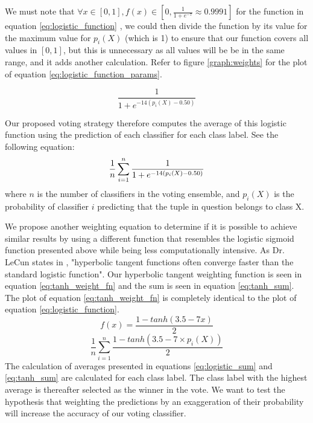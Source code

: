 We must note that $\forall x \in [0,1], f(x) \in [0, \frac{1}{1+e^{-7}}\approx 0.9991]$ for the function in equation \ref{eq:logistic_function} , we could then divide the function by its value for the maximum value for $p_i(X)$ (which is 1) to ensure that our function covers all values in $[0,1]$, but this is unnecessary as all values will be be in the same range, and it adds another calculation.
Refer to figure \ref{graph:weights} for the plot of equation \ref{eq:logistic_function_params}.

\begin{equation}
\frac{1}{1+e^{-14(p_i(X)-0.50)}}
\label{eq:logistic_function_params}
\end{equation}

Our proposed voting strategy therefore computes the average of this logistic function using the prediction of each classifier for each class label. See the following equation:
\begin{equation}
\frac{1}{n}\sum_{i=1}^{n}\frac{1}{1+e^{-14(p_i(X)-0.50)}}\\ 
    \label{eq:logistic_sum}
\end{equation}
where $n$ is the number of classifiers in the voting ensemble, and $p_i(X)$ is the probability of classifier $i$ predicting that the tuple in question belongs to class X.

We propose another weighting equation to determine if it is possible to achieve similar results by using a different function that resembles the logistic sigmoid function presented above while being less computationally intensive. As Dr. LeCun states in \citep[10]{lecun2012efficient},  "hyperbolic tangent functions often converge faster than the standard logistic function".
Our hyperbolic tangent weighting function is seen in equation \ref{eq:tanh_weight_fn} and the sum is seen in equation \ref{eq:tanh_sum}. The plot of equation \ref{eq:tanh_weight_fn} is completely identical to the plot of equation \ref{eq:logistic_function}.
\begin{equation}
    f(x)=\frac{1-tanh(3.5-7x)}{2}
    \label{eq:tanh_weight_fn}
\end{equation}
\begin{equation}
\frac{1}{n}\sum_{i=1}^{n} \frac{1-tanh(3.5-7\times p_i(X))}{2}
    \label{eq:tanh_sum}
\end{equation}
The calculation of averages presented in equations \ref{eq:logistic_sum} and \ref{eq:tanh_sum} are calculated for each class label. The class label with the highest average is thereafter selected as the winner in the vote. We want to test the hypothesis that weighting the predictions by an exaggeration of their probability will increase the accuracy of our voting classifier.

